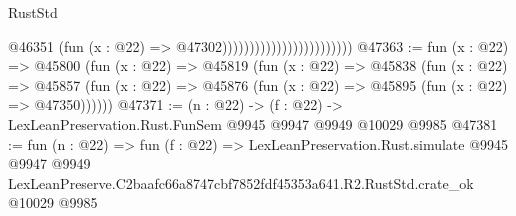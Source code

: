 \begin{lexlean}{RustStd}
\begin{coremodule}
                                                @46351
                                                  (fun (x : @22) => @47302))))))))))))))))))))))))
@47363 := fun (x : @22) =>
  @45800
    (fun (x : @22) =>
    @45819
      (fun (x : @22) =>
      @45838
        (fun (x : @22) =>
        @45857 (fun (x : @22) => @45876 (fun (x : @22) => @45895 (fun (x : @22) => @47350))))))
@47371 := (n : @22) -> (f : @22) -> LexLeanPreservation.Rust.FunSem @9945 @9947 @9949 @10029 @9985
@47381 := fun (n : @22) =>
  fun (f : @22) =>
  LexLeanPreservation.Rust.simulate
    @9945
    @9947
    @9949
    LexLeanPreserve.C2baafc66a8747cbf7852fdf45353a641.R2.RustStd.crate_ok
    @10029
    @9985
\end{coremodule}
\end{lexlean}
